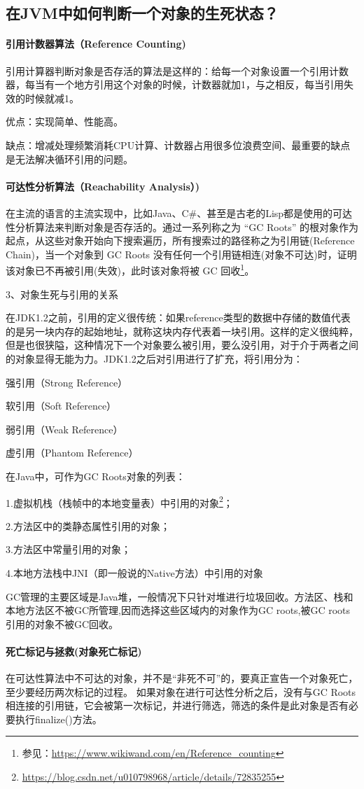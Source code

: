 \documentclass[../../../interview-questions.tex]{subfiles}
\begin{document}
\subsection{在JVM中如何判断一个对象的生死状态？}

\paragraph{引用计数器算法（Reference Counting)}

引用计算器判断对象是否存活的算法是这样的：给每一个对象设置一个引用计数器，每当有一个地方引用这个对象的时候，计数器就加1，与之相反，每当引用失效的时候就减1。

优点：实现简单、性能高。

缺点：增减处理频繁消耗CPU计算、计数器占用很多位浪费空间、最重要的缺点是无法解决循环引用的问题。

\paragraph{可达性分析算法（Reachability Analysis）)}

在主流的语言的主流实现中，比如Java、C\#、甚至是古老的Lisp都是使用的可达性分析算法来判断对象是否存活的。通过一系列称之为 “GC Roots” 的根对象作为起点，从这些对象开始向下搜索遍历，所有搜索过的路径称之为引用链(Reference Chain)，当一个对象到 GC Roots 没有任何一个引用链相连(对象不可达)时，证明该对象已不再被引用(失效)，此时该对象将被 GC 回收\footnote{参见：\url{https://www.wikiwand.com/en/Reference_counting}}。

3、对象生死与引用的关系

在JDK1.2之前，引用的定义很传统：如果reference类型的数据中存储的数值代表的是另一块内存的起始地址，就称这块内存代表着一块引用。这样的定义很纯粹，但是也很狭隘，这种情况下一个对象要么被引用，要么没引用，对于介于两者之间的对象显得无能为力。JDK1.2之后对引用进行了扩充，将引用分为：

强引用（Strong Reference）

软引用（Soft Reference）

弱引用（Weak Reference）

虚引用（Phantom Reference）

在Java中，可作为GC Roots对象的列表：

1.虚拟机栈（栈帧中的本地变量表）中引用的对象\footnote{\url{https://blog.csdn.net/u010798968/article/details/72835255}}；

2.方法区中的类静态属性引用的对象；

3.方法区中常量引用的对象；

4.本地方法栈中JNI（即一般说的Native方法）中引用的对象

GC管理的主要区域是Java堆，一般情况下只针对堆进行垃圾回收。方法区、栈和本地方法区不被GC所管理,因而选择这些区域内的对象作为GC roots,被GC roots引用的对象不被GC回收。


\paragraph{死亡标记与拯救(对象死亡标记)}

在可达性算法中不可达的对象，并不是“非死不可”的，要真正宣告一个对象死亡，至少要经历两次标记的过程。
如果对象在进行可达性分析之后，没有与GC Roots相连接的引用链，它会被第一次标记，并进行筛选，筛选的条件是此对象是否有必要执行finalize()方法。
\end{document}
